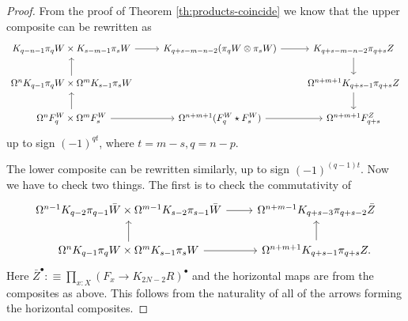 \documentclass{amsart}
\theoremstyle{definition}
\newcommand{\depfun}[2]{\prod\limits_{#1}^{}{#2}}
\begin{document}
\begin{proof}
    From the proof of Theorem \ref{th:products-coincide} we know that the upper composite can be rewritten as
    \[\begin{tikzcd}
    	{K_{q-n-1}\pi_qW \times K_{s-m-1}\pi_sW} & {K_{q+s-m-n-2}(\pi_qW \otimes \pi_sW)} & {K_{q+s-m-n-2}\pi_{q+s}Z} \\
    	{\Omega^n K_{q-1}\pi_qW \times \Omega^m K_{s-1}\pi_sW} && {\Omega^{n+m+1}K_{q+s-1}\pi_{q+s}Z} \\
    	{\Omega^n F_q^W \times \Omega^m F_s^W} & {\Omega^{n+m+1}(F^W_q \star F_s^W)} & {\Omega^{n+m+1}F^Z_{q+s}}
    	\arrow[from=1-1, to=1-2]
    	\arrow[from=1-2, to=1-3]
    	\arrow[from=1-3, to=2-3]
    	\arrow[from=2-1, to=1-1]
    	\arrow[from=2-3, to=3-3]
    	\arrow[from=3-1, to=2-1]
    	\arrow[from=3-1, to=3-2]
    	\arrow[from=3-2, to=3-3]
    \end{tikzcd}\]
    up to sign $(-1)^{qt}$, where $t = m-s, q =n-p$.

    The lower composite can be rewritten similarly, up to sign $(-1)^{(q-1)t}$. Now we have to check two things.
    The first is to check the commutativity of
    \[\begin{tikzcd}
    	{\Omega^{n-1} K_{q-2}\pi_{q-1}{\bar{W}} \times \Omega^{m-1} K_{s-2}\pi_{s-1}{\bar{W}}} & {\Omega^{n+m-1}K_{q+s-3}\pi_{q+s-2}\bar{Z}} \\
    	{\Omega^n K_{q-1}\pi_qW \times \Omega^m K_{s-1}\pi_sW} & {\Omega^{n+m+1}K_{q+s-1}\pi_{q+s}Z.}
    	\arrow[from=1-1, to=1-2]
    	\arrow[from=2-1, to=1-1]
    	\arrow[from=2-1, to=2-2]
    	\arrow[from=2-2, to=1-2]
    \end{tikzcd}\]
    Here $\bar{Z}^{\bullet }  :\equiv \depfun{x:X}{(F_x \to K_{2N-2}R)^\bullet}$ and the horizontal maps are from the composites as above. This follows from the naturality of all of the arrows forming the horizontal composites.


\end{proof}
\end{document}
